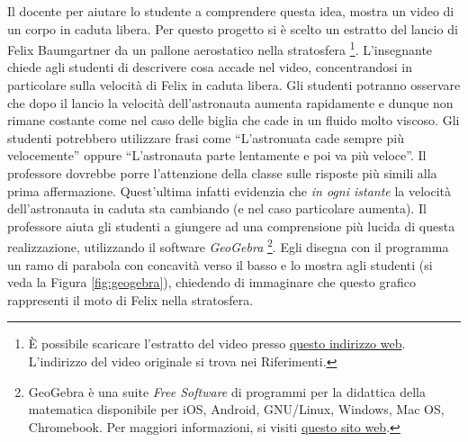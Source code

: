 \documentclass{report} \usepackage[T1]{fontenc} \usepackage[italian]{babel}
\begin{document}
Il docente per aiutare lo studente a comprendere questa idea,
mostra un video di un corpo in caduta libera. Per questo progetto
si è scelto un estratto del lancio di Felix Baumgartner da un
pallone aerostatico nella stratosfera
\footnote{
          \`E possibile scaricare l'estratto del video presso
          \textcolor{blue}{\href{https://github.com/savaroskij/PED1/blob/master/progetto_finale/media/video/felix_baumgartner.mp4?raw=true}{questo indirizzo web}}.
          L'indirizzo del video originale si trova nei Riferimenti\cite{felix}.
         }.
L'insegnante chiede agli studenti di descrivere cosa accade nel
video, concentrandosi in particolare sulla velocità di Felix in caduta
libera. Gli studenti potranno osservare che dopo il lancio la velocità
dell'astronauta aumenta rapidamente e dunque non rimane costante come nel
caso delle biglia che cade in un fluido molto viscoso.
Gli studenti potrebbero utilizzare frasi come ``L'astronuata cade
sempre più velocemente'' oppure ``L'astronauta parte
lentamente e poi va più veloce''.
Il professore dovrebbe porre l'attenzione della classe sulle
risposte più simili alla prima affermazione. Quest'ultima
infatti evidenzia che \emph{in ogni istante} la velocità
dell'astronauta in caduta sta cambiando (e nel caso particolare aumenta).
Il professore aiuta gli studenti a giungere ad una comprensione
più lucida di questa realizzazione, utilizzando il software
\emph{GeoGebra}
\footnote{
          GeoGebra è una suite \emph{Free Software} di programmi per la didattica della
          matematica
          disponibile per iOS, Android, GNU/Linux, Windows, Mac OS, Chromebook.
          Per maggiori informazioni, si visiti
          \textcolor{blue}{\href{https://www.geogebra.org/}{questo sito web}}.
         }.
Egli disegna con il programma un ramo di parabola con concavità
verso il basso e lo mostra agli studenti (si veda la Figura
\ref{fig:geogebra}), chiedendo di immaginare che questo grafico
rappresenti il moto di Felix nella stratosfera.
\end{document}
